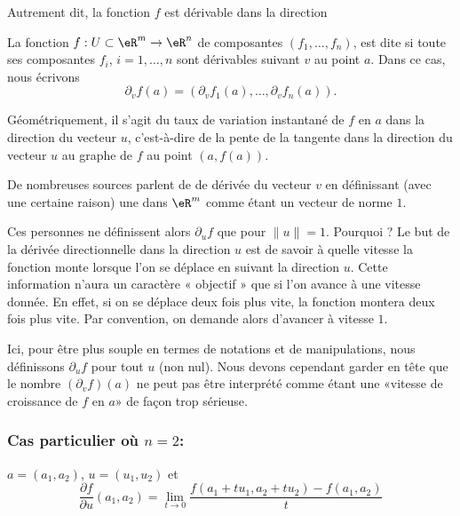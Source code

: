Autrement dit, la fonction \( f \) est dérivable dans la direction 

\begin{definition}
  La fonction $f:U\subset\eR^m\to \eR^n$ de composantes $(f_1,\ldots, f_n)$, est dite  si toute ses composantes $f_i$, $i=1,\ldots, n$ sont dérivables suivant $v$ au point $a$. Dans ce cas, nous écrivons
  \begin{equation}
	\partial_v f(a)=\left(\partial_v f_1(a), \ldots, \partial_v f_n(a)\right).
  \end{equation}
\end{definition}

Géométriquement, il s'agit du taux de variation instantané de $f$ en $a$ dans la direction du vecteur $u$, c'est-à-dire de la pente de la tangente dans la direction du vecteur $u$ au graphe de $f$ au point $(a, f(a))$.

\begin{remark}
    De nombreuses sources parlent de de dérivée  du vecteur $v$ en définissant (avec une certaine raison) une  dans $\eR^m$ comme étant un vecteur de norme $1$.

    Ces personnes ne définissent alors \( \partial_uf\) que pour \( \| u \|=1\). Pourquoi ? Le but de la dérivée directionnelle dans la direction $u$ est de savoir à quelle vitesse la fonction monte lorsque l'on se déplace en suivant la direction $u$. Cette information n'aura un caractère « objectif » que si l'on avance à une vitesse donnée. En effet, si on se déplace deux fois plus vite, la fonction montera deux fois plus vite. Par convention, on demande alors d'avancer à vitesse \( 1\).

    Ici, pour être plus souple en termes de notations et de manipulations, nous définissons \( \partial_uf\) pour tout \( u\) (non nul). Nous devons cependant garder en tête que le nombre \( (\partial_vf)(a)\) ne peut pas être interprété comme étant une «vitesse de croissance de \( f\) en \( a\)» de façon trop sérieuse.
\end{remark}

\subsubsection*{Cas particulier où $n=2$:} $a = (a_1, a_2)$, $u =
(u_1,u_2)$ et
$$\frac{\partial f}{\partial u}(a_1, a_2) = \lim_{t\rightarrow
0}\frac{f(a_1+tu_1,a_2+tu_2) - f(a_1, a_2)}{t}$$

